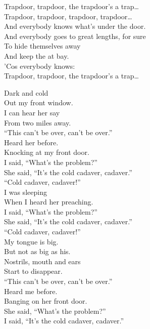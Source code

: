 Trapdoor, trapdoor, the trapdoor's a trap… \\
Trapdoor, trapdoor, trapdoor, trapdoor… \\

And everybody knows what's under the door. \\
And everybody goes to great lengths, for sure \\
To hide themselves away \\
And keep the  at bay. \\
'Cos everybody knows: \\

Trapdoor, trapdoor, the trapdoor's a trap… \\




Dark and cold \\
Out my front window. \\
I can hear her say \\
From two miles away. \\

``This can't be over, can't be over.'' \\

Heard her before. \\
Knocking at my front door. \\
I said, ``What's the problem?'' \\
She said, ``It's the cold cadaver, cadaver.'' \\

``Cold cadaver, cadaver!'' \\

I was sleeping \\
When I heard her preaching. \\
I said, ``What's the problem?'' \\
She said, ``It's the cold cadaver, cadaver.'' \\

``Cold cadaver, cadaver!'' \\

My tongue is big. \\
But not as big as his. \\
Nostrils, mouth and ears \\
Start to disappear. \\

``This can't be over, can't be over.'' \\
Heard me before. \\
Banging on her front door. \\
She said, ``What's the problem?'' \\
I said, ``It's the cold cadaver, cadaver.'' \\

